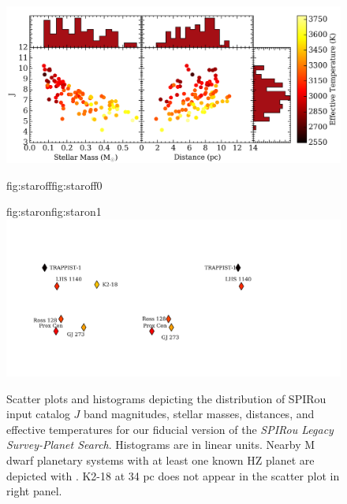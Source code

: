 \begin{figure}
  \centering
  \includegraphics[width=0.8\hsize]{figures/stellarpop_bkgd.png}%
  \hspace{-0.8\hsize}%
  \begin{ocg}{fig:staroff}{fig:staroff}{0}%
  \end{ocg}%
  \begin{ocg}{fig:staron}{fig:staron}{1}%
    \includegraphics[width=0.8\hsize]{figures/stellarpop_stars.png}%
  \end{ocg}
  \hspace{-0.8\hsize}%
  \caption[Stellar parameters of sources targetted in the simulated \emph{SPIRou Legacy Survey-Planet Search}.]
      {\small Scatter plots and histograms depicting the distribution of SPIRou input catalog
    $J$ band magnitudes, stellar masses, distances, and effective temperatures for our fiducial 
    version of the \emph{SPIRou Legacy Survey-Planet Search}. Histograms are
    in linear units. Nearby M dwarf planetary systems with at least one known HZ planet
    are depicted with
    . K2-18 at 34 pc does not
    appear in the scatter plot in right panel.}
  \label{BSfig:stellardist}
\end{figure}

